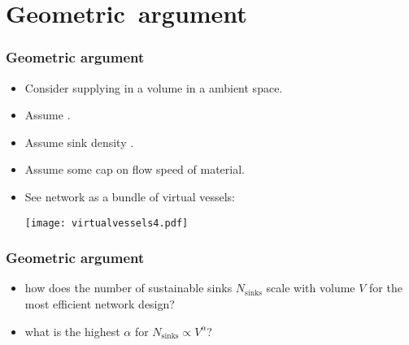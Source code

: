 
\section{Geometric\ argument}

\begin{frame}
  \frametitle{Geometric argument}

  \begin{block}{}
  \begin{itemize}
  \item<2-> 
    Consider  supplying  in a  
    volume
    in a  ambient space.
  \item<3->
    Assume .
  \item<4->
    Assume sink density .
  \item<5-> 
    Assume some cap on flow speed of material.
  \item<6-> 
    See network as a bundle of virtual vessels:
    \begin{center}
      \begin{overprint}
        \begin{center}
          \texttt{[image: virtualvessels4.pdf]}
        \end{center}
      \end{overprint}
    \end{center}
  \end{itemize}
  \end{block}

\end{frame}

\begin{frame}
  \frametitle{Geometric argument}

  \begin{block}{}
  \begin{itemize}
  \item<1-> 
     how does the number of sustainable
    sinks $N_{\textrm{sinks}}$
    scale with volume $V$ for the most efficient network design?
  \item<2-> 
     what is the highest $\alpha$ for $N_{\textrm{sinks}} \propto V^{\alpha}$?
  \end{itemize}
  \end{block}

\end{frame}

